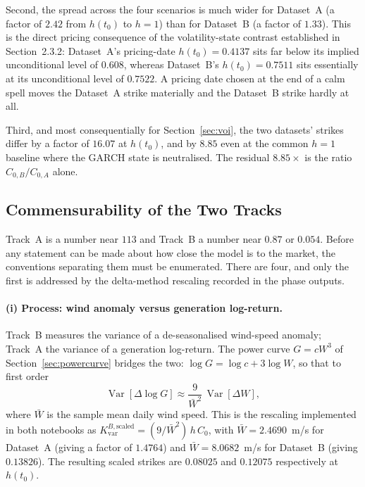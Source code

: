 \documentclass[11pt, a4paper, twoside]{article}
\begin{document}
Second, the spread across the four scenarios is much wider for Dataset~A (a factor of $2.42$ from $h(t_0)$ to $h = 1$) than for Dataset~B (a factor of $1.33$). This is the direct pricing consequence of the volatility-state contrast established in Section~2.3.2: Dataset~A's pricing-date $h(t_0) = 0.4137$ sits far below its implied unconditional level of $0.608$, whereas Dataset~B's $h(t_0) = 0.7511$ sits essentially at its unconditional level of $0.7522$. A pricing date chosen at the end of a calm spell moves the Dataset~A strike materially and the Dataset~B strike hardly at all.

Third, and most consequentially for Section~\ref{sec:voi}, the two datasets' strikes differ by a factor of $16.07$ at $h(t_0)$, and by $8.85$ even at the common $h = 1$ baseline where the GARCH state is neutralised. The residual $8.85\times$ is the ratio $C_{0,B}/C_{0,A}$ alone.

\subsection{Commensurability of the Two Tracks}
\label{sec:reconciliation}

Track~A is a number near $113$ and Track~B a number near $0.87$ or $0.054$. Before any statement can be made about how close the model is to the market, the conventions separating them must be enumerated. There are four, and only the first is addressed by the delta-method rescaling recorded in the phase outputs.

\paragraph{(i) Process: wind anomaly versus generation log-return.} Track~B measures the variance of a de-seasonalised wind-speed anomaly; Track~A the variance of a generation log-return. The power curve $G = cW^3$ of Section~\ref{sec:powercurve} bridges the two: $\log G = \log c + 3\log W$, so that to first order
\begin{equation}
\operatorname{Var}\!\left[\Delta \log G\right] \approx \frac{9}{\bar W^2}\,\operatorname{Var}[\Delta W],
\label{eq:delta-method}
\end{equation}
where $\bar W$ is the sample mean daily wind speed. This is the rescaling implemented in both notebooks as $K_{\text{var}}^{B,\text{scaled}} = (9/\bar W^2)\, h\, C_0$, with $\bar W = 2.4690$~m/s for Dataset~A (giving a factor of $1.4764$) and $\bar W = 8.0682$~m/s for Dataset~B (giving $0.13826$). The resulting scaled strikes are $0.08025$ and $0.12075$ respectively at $h(t_0)$.
\end{document}
